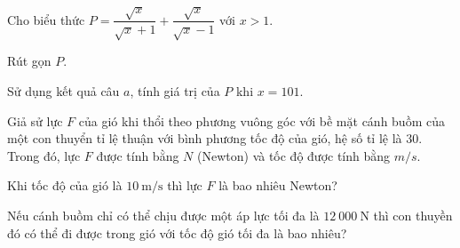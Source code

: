 \begin{bt}
	Cho biểu thức $P=\dfrac{\sqrt{x}}{\sqrt{x}+1}+\dfrac{\sqrt{x}}{\sqrt{x}-1}$ với $x>1$.
	\begin{listEX}
	\item Rút gọn $P$.
	\item Sử dụng kết quả câu $a$, tính giá trị của $P$ khi $x=101$.
	\end{listEX}
\end{bt}
\begin{bt}
	Giả sử lực $F$ của gió khi thổi theo phương vuông góc với bề mặt cánh buồm của một con thuyển tỉ lệ thuận với bình phương tốc độ của gió, hệ số tỉ lệ là $30$. Trong đó, lực $F$ được tính bằng $N$ (Newton) và tốc độ được tính bằng $m/s$.
	\begin{listEX}
	\item Khi tốc độ của gió là $10 \mathrm{~m} / \mathrm{s}$ thì lực $F$ là bao nhiêu Newton?
	\item Nếu cánh buồm chỉ có thể chịu được một áp lực tối đa là $12~000 \mathrm{~N}$ thì con thuyền đó có thể đi được trong gió với tốc độ gió tối đa là bao nhiêu?
	\end{listEX}
\end{bt}
